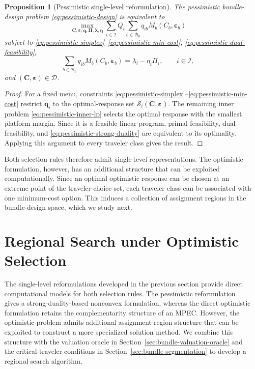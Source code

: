 \documentclass{article}
\newtheorem{proposition}{Proposition}
\begin{document}
\begin{proposition}[Pessimistic single-level reformulation]
The pessimistic bundle-design problem
\eqref{eq:pessimistic-design} is equivalent to
\begin{equation}
    \max_{\bm C,\bm\varepsilon,\bm q,\bm\Pi,\bm\lambda,\bm\eta}
    \sum_{i\in\mathcal I}
    Q_i
    \sum_{b\in\mathcal B_0}
    q_{ib}M_b(C_b,\bm\varepsilon_b)
    \label{eq:pessimistic-single-level-objective}
\end{equation}
subject to
\eqref{eq:pessimistic-simplex}--\eqref{eq:pessimistic-min-cost},
\eqref{eq:pessimistic-dual-feasibility},
\begin{equation}
    \sum_{b\in\mathcal B_0}
    q_{ib}M_b(C_b,\bm\varepsilon_b)
    =
    \lambda_i-\eta_i\Pi_i,
    \qquad
    i\in\mathcal I,
    \label{eq:pessimistic-strong-duality}
\end{equation}
and $(\bm C,\bm\varepsilon)\in\mathcal D$.
\label{prop:pessimistic-single-level}
\end{proposition}

\begin{proof}
For a fixed menu, constraints
\eqref{eq:pessimistic-simplex}--\eqref{eq:pessimistic-min-cost}
restrict $\bm q_i$ to the optimal-response set
$\mathcal S_i(\bm C,\bm\varepsilon)$. The remaining inner problem
\eqref{eq:pessimistic-inner-lp} selects the optimal response with the
smallest platform margin. Since it is a feasible linear program, primal
feasibility, dual feasibility, and
\eqref{eq:pessimistic-strong-duality} are equivalent to its optimality.
Applying this argument to every traveler class gives the result.
\end{proof}

Both selection rules therefore admit single-level representations.
The optimistic formulation, however, has an additional structure that
can be exploited computationally. Since an optimal optimistic response
can be chosen at an extreme point of the traveler-choice set, each
traveler class can be associated with one minimum-cost option. This
induces a collection of assignment regions in the bundle-design space,
which we study next.

\section{Regional Search under Optimistic Selection}
\label{sec:regional-search}

The single-level reformulations developed in the previous section provide
direct computational models for both selection rules. The pessimistic
reformulation gives a strong-duality-based nonconvex formulation, whereas
the direct optimistic formulation retains the complementarity structure
of an MPEC. However, the optimistic problem admits additional
assignment-region structure that can be exploited to construct a more
specialized solution method. We combine this structure with the valuation
oracle in Section~\ref{sec:bundle-valuation-oracle} and the critical-traveler
conditions in Section~\ref{sec:bundle-segmentation} to develop a regional
search algorithm.
\end{document}
